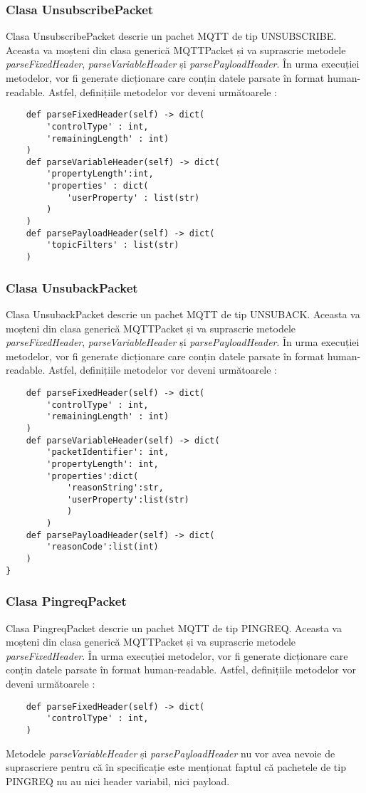 \documentclass{report}
\begin{document}
\subsubsection{Clasa UnsubscribePacket}
Clasa UnsubscribePacket descrie un pachet MQTT de tip UNSUBSCRIBE. Aceasta va moșteni din clasa generică MQTTPacket și va suprascrie metodele \emph{parseFixedHeader}, \emph{parseVariableHeader} și \emph{parsePayloadHeader}.
În urma execuției metodelor, vor fi generate dicționare care conțin datele parsate în format human-readable.
Astfel, definițiile metodelor vor deveni următoarele : 
\\
\begin{verbatim}
	def parseFixedHeader(self) -> dict(
		'controlType' : int, 
		'remainingLength' : int)
	)
	def parseVariableHeader(self) -> dict(
		'propertyLength':int,
		'properties' : dict(
			'userProperty' : list(str)
		)
	)
	def parsePayloadHeader(self) -> dict(
		'topicFilters' : list(str)
	)
\end{verbatim}
\subsubsection{Clasa UnsubackPacket}
Clasa UnsubackPacket descrie un pachet MQTT de tip UNSUBACK. Aceasta va moșteni din clasa generică MQTTPacket și va suprascrie metodele \emph{parseFixedHeader}, \emph{parseVariableHeader} și \emph{parsePayloadHeader}.
În urma execuției metodelor, vor fi generate dicționare care conțin datele parsate în format human-readable.
Astfel, definițiile metodelor vor deveni următoarele : 
\\
\begin{verbatim}
	def parseFixedHeader(self) -> dict(
		'controlType' : int, 
		'remainingLength' : int)
	)
    def parseVariableHeader(self) -> dict(
    	'packetIdentifier': int,
    	'propertyLength': int,
    	'properties':dict(
    		'reasonString':str,
    		'userProperty':list(str)
    		)
    	)
	def parsePayloadHeader(self) -> dict(
		'reasonCode':list(int)
	)
}
\end{verbatim}
\subsubsection{Clasa PingreqPacket}
Clasa PingreqPacket descrie un pachet MQTT de tip PINGREQ. Aceasta va moșteni din clasa generică MQTTPacket și va suprascrie metodele \emph{parseFixedHeader}.
În urma execuției metodelor, vor fi generate dicționare care conțin datele parsate în format human-readable.
Astfel, definițiile metodelor vor deveni următoarele : 
\begin{verbatim}
	def parseFixedHeader(self) -> dict(
		'controlType' : int, 
	)
\end{verbatim}
Metodele \emph{parseVariableHeader} și \emph{parsePayloadHeader} nu vor avea nevoie de suprascriere pentru că în specificație este menționat faptul că pachetele de tip PINGREQ nu au nici header variabil, nici payload.
\end{document}
